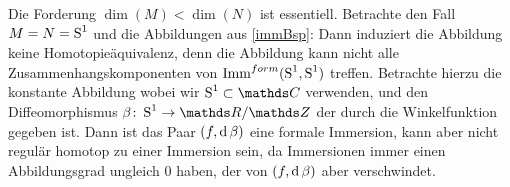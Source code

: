 \begin{Bsp}
	Die Forderung $ \dim(M)<\dim(N) $ ist essentiell. Betrachte 
	den Fall $ M=N=\S^1 $ und die Abbildungen aus \cref{immBsp}:
	Dann induziert die Abbildung 
	keine Homotopieäquivalenz, denn die Abbildung kann
	nicht alle Zusammenhangskomponenten von $ \Immf{\S^1}{\S^1} $
	treffen. Betrachte hierzu die konstante Abbildung
	 wobei wir $ \S^1\subset\c$ 
	verwenden, und den Diffeomorphismus $ \abb{\beta}{\S^1}{\R / \Z} $
	der durch die Winkelfunktion gegeben ist. Dann ist das Paar $ (f,\d \beta) $ eine formale Immersion, kann aber nicht regulär
	homotop zu einer Immersion sein, da Immersionen immer einen 
	Abbildungsgrad ungleich $ 0 $ haben, der von $ (f,\d \beta) $ aber
	verschwindet.
\end{Bsp}


